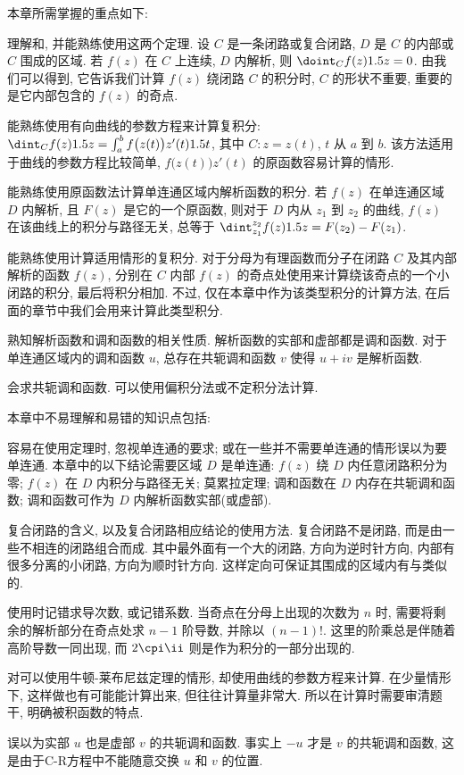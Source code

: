
本章所需掌握的重点如下:
\begin{enuma}
  \item 理解\thmCG 和\thmCCC, 并能熟练使用这两个定理.
  设 $C$ 是一条闭路或复合闭路, $D$ 是 $C$ 的内部或 $C$ 围成的区域.
  若 $f(z)$ 在 $C$ 上连续, $D$ 内解析, 则 $\doint_C f(z)\d z=0$.
  由\thmCCC 我们可以得到\thmCT, 它告诉我们计算 $f(z)$ 绕闭路 $C$ 的积分时, $C$ 的形状不重要, 重要的是它内部包含的 $f(z)$ 的奇点.
  \item 能熟练使用有向曲线的参数方程来计算复积分: $\dint_C f(z)\d z=\int_a^bf\bigl(z(t)\bigr)z'(t)\d t$, 其中 $C:z=z(t)$, $t$ 从 $a$ 到 $b$.
  该方法适用于曲线的参数方程比较简单, $f\bigl(z(t)\bigr)z'(t)$ 的原函数容易计算的情形.
  \item 能熟练使用原函数法计算单连通区域内解析函数的积分.
  若 $f(z)$ 在单连通区域 $D$ 内解析, 且 $F(z)$ 是它的一个原函数, 则对于 $D$ 内从 $z_1$ 到 $z_2$ 的曲线, $f(z)$ 在该曲线上的积分与路径无关, 总等于 $\dint_{z_1}^{z_2}f(z)\d z=F(z_2)-F(z_1)$.
  \item 能熟练使用\thmCIH 计算适用情形的复积分. 对于分母为有理函数而分子在闭路 $C$ 及其内部解析的函数 $f(z)$, 分别在 $C$ 内部 $f(z)$ 的奇点处使用\thmCIH 来计算绕该奇点的一个小闭路的积分, 最后将积分相加.
  不过, \thmCIH 仅在本章中作为该类型积分的计算方法, 在后面的章节中我们会用\thmRes 来计算此类型积分.
  \item 熟知解析函数和调和函数的相关性质. 解析函数的实部和虚部都是调和函数. 对于单连通区域内的调和函数 $u$, 总存在共轭调和函数 $v$ 使得 $u+iv$ 是解析函数.
  \item 会求共轭调和函数. 可以使用偏积分法或不定积分法计算.
\end{enuma}

本章中不易理解和易错的知识点包括:
\begin{enuma}
  \item 容易在使用定理时, 忽视单连通的要求; 或在一些并不需要单连通的情形误以为要单连通.
  本章中的以下结论需要区域 $D$ 是单连通: $f(z)$ 绕 $D$ 内任意闭路积分为零; $f(z)$ 在 $D$ 内积分与路径无关; 莫累拉定理; 调和函数在 $D$ 内存在共轭调和函数; 调和函数可作为 $D$ 内解析函数实部(或虚部).
  \item 复合闭路的含义, 以及复合闭路相应结论的使用方法.
  复合闭路不是闭路, 而是由一些不相连的闭路组合而成.
  其中最外面有一个大的闭路, 方向为逆时针方向, 内部有很多分离的小闭路, 方向为顺时针方向.
  这样定向可保证其围成的区域内有与\thmCR 类似的\thmCCC.
  \item 使用\thmCIH 时记错求导次数, 或记错系数. 当奇点在分母上出现的次数为 $n$ 时, 需要将剩余的解析部分在奇点处求 $n-1$ 阶导数, 并除以 $(n-1)!$. 这里的阶乘总是伴随着高阶导数一同出现, 而 $2\cpi\ii$ 则是作为积分的一部分出现的.
  \item 对可以使用牛顿-莱布尼兹定理的情形, 却使用曲线的参数方程来计算. 在少量情形下, 这样做也有可能能计算出来, 但往往计算量非常大. 所以在计算时需要审清题干, 明确被积函数的特点.
  \item 误以为实部 $u$ 也是虚部 $v$ 的共轭调和函数. 事实上 $-u$ 才是 $v$ 的共轭调和函数, 这是由于C-R方程中不能随意交换 $u$ 和 $v$ 的位置.
\end{enuma}



